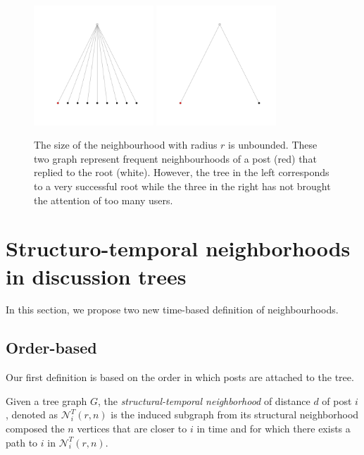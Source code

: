 \documentclass[9pt,technote]{IEEEtran}
\begin{document}
\begin{figure}
	\centering
	\includegraphics[width=0.4\textwidth]{large_neighborhood}
	\includegraphics[width=0.4\textwidth]{small_neighborhood}
	\caption{The size of the neighbourhood with radius $r$ is unbounded. These two graph represent frequent neighbourhoods of a post (red) that replied to the root (white). However, the tree in the left corresponds to a very successful root while the three in the right has not brought the attention of too many users.}
	\label{fig:large_neighbourhood}
\end{figure}


\section{Structuro-temporal neighborhoods in discussion trees}
In this section, we propose two new time-based definition of neighbourhoods.

\subsection{Order-based}
Our first definition is based on the order in which posts are attached to the tree. 
\begin{definition}
Given a tree graph $G$, the \textit{structural-temporal neighborhood} of distance $d$ of post $i$, denoted as $\mathcal{N}_{i}^T(r,n)$ is the induced subgraph from its structural neighborhood composed the $n$ vertices that are closer to $i$ in time and for which there exists a path to $i$ in $\mathcal{N}_{i}^T(r,n)$.  
\end{definition}
\end{document}
